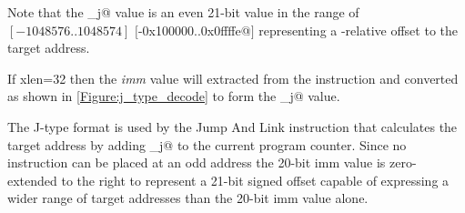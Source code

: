 Note that the \verb@imm_j@ value is 
an even 21-bit value in the range of 
$[-1048576..1048574]$ $[$\verb@-0x100000..0x0ffffe@$]$ representing a \verb@pc@-relative offset to the 
target address. 




If \Gls{xlen}=32 then the {\em imm} value will extracted from the 
instruction and converted as shown in \autoref{Figure:j_type_decode} to
form the \verb@imm_j@ value.

\begin{figure}[ht]
\centering
\DrawInsnOpJTypeDecoding
{}
\label{Figure:j_type_decode}
\label{imm.j:decode}
\end{figure}


%
%
%
%

The J-type format is used by the Jump And Link instruction that calculates 
the target address by adding \verb@imm_j@ to the current program 
counter.  Since no instruction can be placed at an odd address the 20-bit 
imm value is zero-extended to the right to represent a 21-bit signed offset 
capable of expressing a wider range of target addresses than the 20-bit 
imm value alone.

